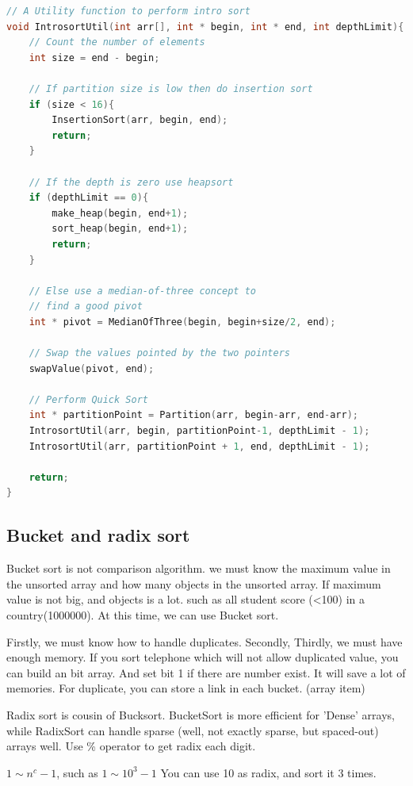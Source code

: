\documentclass[a4paper,11pt,twoside]{book}
\begin{document}
\begin{lstlisting}[frame=single, language=c++]
// A Utility function to perform intro sort
void IntrosortUtil(int arr[], int * begin, int * end, int depthLimit){
	// Count the number of elements
	int size = end - begin;
	
	// If partition size is low then do insertion sort
	if (size < 16){
		InsertionSort(arr, begin, end);
		return;
	}
	
	// If the depth is zero use heapsort
	if (depthLimit == 0){
		make_heap(begin, end+1);
		sort_heap(begin, end+1);
		return;
	}
	
	// Else use a median-of-three concept to
	// find a good pivot
	int * pivot = MedianOfThree(begin, begin+size/2, end);
	
	// Swap the values pointed by the two pointers
	swapValue(pivot, end);
	
	// Perform Quick Sort
	int * partitionPoint = Partition(arr, begin-arr, end-arr);
	IntrosortUtil(arr, begin, partitionPoint-1, depthLimit - 1);
	IntrosortUtil(arr, partitionPoint + 1, end, depthLimit - 1);
	
	return;
}	
\end{lstlisting}	


\subsection{Bucket and radix sort}


\par Bucket sort is not comparison algorithm.  we must know the maximum value in the unsorted array and how many objects in the unsorted array. If maximum value is not big, and objects is a lot. such as all student score (<100) in a country(1000000). At this time, we can use Bucket sort. 
	
\par Firstly, we must know how to handle duplicates. Secondly,  Thirdly, we must have enough memory. If you sort telephone which will not allow duplicated value, you can build an bit array. And set bit 1 if there are number exist. It will save a lot of memories.   For duplicate, you can store a link in each bucket. (array item)

\par Radix sort is cousin of Bucksort. BucketSort is more efficient for 'Dense' arrays, while RadixSort can handle sparse (well, not exactly sparse, but spaced-out) arrays well. Use \% operator to get radix each digit. 

\par $ 1\sim n^c-1$, such as $ 1\sim10^3-1 $  You can use 10 as radix, and sort it 3 times. 
\end{document}
